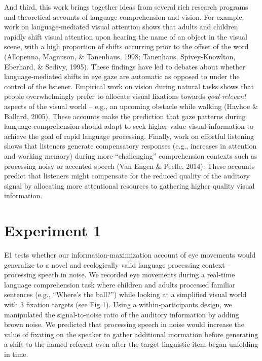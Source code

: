 \documentclass[10pt, letterpaper]{article}
\begin{document}
And third, this work brings together ideas from several rich research
programs and theoretical accounts of language comprehension and vision.
For example, work on language-mediated visual attention shows that
adults and children rapidly shift visual attention upon hearing the name
of an object in the visual scene, with a high proportion of shifts
occurring prior to the offset of the word (Allopenna, Magnuson, \&
Tanenhaus, 1998; Tanenhaus, Spivey-Knowlton, Eberhard, \& Sedivy, 1995).
These findings have led to debates about whether language-mediated
shifts in eye gaze are automatic as opposed to under the control of the
listener. Empirical work on vision during natural tasks shows that
people overwhelmingly prefer to allocate visual fixations towards
\emph{goal-relevant} aspects of the visual world -- e.g., an upcoming
obstacle while walking (Hayhoe \& Ballard, 2005). These accounts make
the prediction that gaze patterns during language comprehension should
adapt to seek higher value visual information to achieve the goal of
rapid language processing. Finally, work on effortful listening shows
that listeners generate compensatory responses (e.g., increases in
attention and working memory) during more ``challenging'' comprehension
contexts such as processing noisy or accented speech (Van Engen \&
Peelle, 2014). These accounts predict that listeners might compensate
for the reduced quality of the auditory signal by allocating more
attentional resources to gathering higher quality visual information.

\section{Experiment 1}\label{experiment-1}

E1 tests whether our information-maximization account of eye movements
would generalize to a novel and ecologically valid language processing
context -- processing speech in noise. We recorded eye movements during
a real-time language comprehension task where children and adults
processed familiar sentences (e.g., ``Where's the ball?'') while looking
at a simplified visual world with 3 fixation targets (see Fig 1). Using
a within-participants design, we manipulated the signal-to-noise ratio
of the auditory information by adding brown noise. We predicted that
processing speech in noise would increase the value of fixating on the
speaker to gather additional inormation before generating a shift to the
named referent even after the target linguistic item began unfolding in
time.
\end{document}
